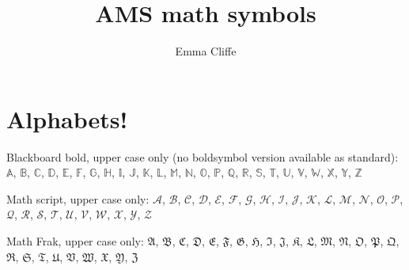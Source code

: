 \usepackage[mathscr]{eucal}
\usepackage{eufrak} 
\usepackage{longtable} 
\usepackage{verbatim} 
\usepackage{url} 
\newtheorem{theorem}{Theorem}[section]
\title{AMS math symbols}
\author{Emma Cliffe}
\date{}
\pagestyle{headings}

\maketitle

\section{Alphabets!}

\noindent 
Blackboard bold, upper case only (no boldsymbol version available as standard):
\(\mathbb{A}\), \(\mathbb{B}\), \(\mathbb{C}\), \(\mathbb{D}\), \(\mathbb{E}\), \(\mathbb{F}\), \(\mathbb{G}\), \(\mathbb{H}\), \(\mathbb{I}\), \(\mathbb{J}\), \(\mathbb{K}\), \(\mathbb{L}\), \(\mathbb{M}\), \(\mathbb{N}\), \(\mathbb{O}\), \(\mathbb{P}\), \(\mathbb{Q}\), \(\mathbb{R}\), \(\mathbb{S}\), \(\mathbb{T}\), \(\mathbb{U}\), \(\mathbb{V}\), \(\mathbb{W}\), \(\mathbb{X}\), \(\mathbb{Y}\), \(\mathbb{Z}\)

\bigskip

\noindent
Math script, upper case only:
\(\mathscr{A}\), \(\mathscr{B}\), \(\mathscr{C}\), \(\mathscr{D}\), \(\mathscr{E}\), \(\mathscr{F}\), \(\mathscr{G}\), \(\mathscr{H}\), \(\mathscr{I}\), \(\mathscr{J}\), \(\mathscr{K}\), \(\mathscr{L}\), \(\mathscr{M}\), \(\mathscr{N}\), \(\mathscr{O}\), \(\mathscr{P}\), \(\mathscr{Q}\), \(\mathscr{R}\), \(\mathscr{S}\), \(\mathscr{T}\), \(\mathscr{U}\), \(\mathscr{V}\), \(\mathscr{W}\), \(\mathscr{X}\), \(\mathscr{Y}\), \(\mathscr{Z}\)

\bigskip

\noindent
Math Frak, upper case only:
\(\mathfrak{A}\), \(\mathfrak{B}\), \(\mathfrak{C}\), \(\mathfrak{D}\), \(\mathfrak{E}\), \(\mathfrak{F}\), \(\mathfrak{G}\), \(\mathfrak{H}\), \(\mathfrak{I}\), \(\mathfrak{J}\), \(\mathfrak{K}\), \(\mathfrak{L}\), \(\mathfrak{M}\), \(\mathfrak{N}\), \(\mathfrak{O}\), \(\mathfrak{P}\), \(\mathfrak{Q}\), \(\mathfrak{R}\), \(\mathfrak{S}\), \(\mathfrak{T}\), \(\mathfrak{U}\), \(\mathfrak{V}\), \(\mathfrak{W}\), \(\mathfrak{X}\), \(\mathfrak{Y}\), \(\mathfrak{Z}\)


